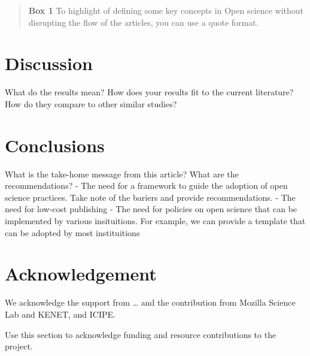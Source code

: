\begin{quote}
\textbf{Box 1} To highlight of defining some key concepts in Open
science without disrupting the flow of the articles, you can use a quote
format.
\end{quote}

\section*{Discussion}\label{discussion}

What do the results mean? How does your results fit to the current
literature? How do they compare to other similar studies?

\section*{Conclusions}\label{conclusions}

What is the take-home message from this article? What are the
recommendations? - The need for a framework to guide the adoption of
open science practices. Take note of the bariers and provide
recommendations. - The need for low-cost publishing - The need for
policies on open science that can be implemented by various
insituitions. For example, we can provide a template that can be adopted
by most instituitions

\section{Acknowledgement}\label{acknowledgement}

We acknowledge the support from \ldots{} and the contribution from
Mozilla Science Lab and KENET, and ICIPE.

Use this section to acknowledge funding and resource contributions to
the project.
